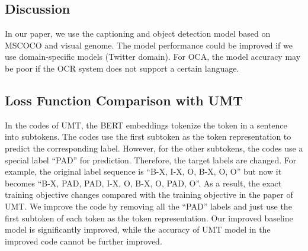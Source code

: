 \documentclass[11pt]{article}
\begin{document}
\subsection{Discussion}
In our paper, we use the captioning and object detection model based on MSCOCO and visual genome. The model performance could be improved if we use domain-specific models (Twitter domain). For OCA, the model accuracy may be poor if the OCR system does not support a certain language.

\subsection{Loss Function Comparison with UMT}
\label{app:bug}
In the codes of UMT, the BERT embeddings tokenize the token in a sentence into subtokens. The codes use the first subtoken as the token representation to predict the corresponding label. However, for the other subtokens, the codes use a special label ``PAD'' for prediction. Therefore, the target labels are changed. For example, the original label sequence is ``B-X, I-X, O, B-X, O, O'' but now it becomes ``B-X, PAD, PAD, I-X, O, B-X, O, PAD, O''. As a result, the exact training objective changes compared with the training objective in the paper of UMT. We improve the code by removing all the ``PAD'' labels and just use the first subtoken of each token as the token representation. Our improved baseline model is significantly improved, while the accuracy of UMT model in the improved code cannot be further improved.
\end{document}
